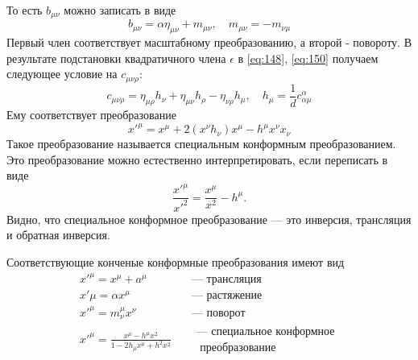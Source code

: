 \documentclass[a4paper,12pt]{article}
\theoremstyle{definition}
\theoremstyle{definition}
\theoremstyle{definition}
\begin{document}
То есть $b_{\mu\nu}$ можно записать в виде
\begin{equation}
  \label{eq:159}
  b_{\mu\nu}=\alpha \eta_{\mu\nu} +m_{\mu\nu},\quad m_{\mu\nu}=-m_{\nu\mu}
\end{equation}
Первый член соответствует масштабному преобразованию, а второй - повороту. 
В результате подстановки квадратичного члена $\epsilon$ в \eqref{eq:148}, \eqref{eq:150} получаем следующее условие на $c_{\mu\nu\rho}$:
\begin{equation}
  \label{eq:160}
  c_{\mu\nu\rho}=\eta_{\mu\rho} h_{\nu} +\eta_{\mu\nu}h_{\rho}-\eta_{\nu\rho}h_{\mu}, \quad h_{\mu}=\frac{1}{d} c^{\alpha}_{\alpha\mu}
\end{equation}
Ему соответствует преобразование
\begin{equation}
  \label{eq:161}
  x'^{\mu}=x^{\mu}+2 (x^{\nu}h_{\nu})x^{\mu} -h^{\mu} x^{\nu}x_{\nu}
\end{equation}
Такое преобразование называется специальным конформным преобразованием.
Это преобразование можно естественно интерпретировать, если переписать в виде
\begin{equation}
  \label{eq:162}
  \frac{x'^{\mu}}{x'^2}=\frac{x^{\mu}}{x^2}-h^{\mu}.
\end{equation}
Видно, что специальное конформное преобразование --- это инверсия, трансляция и обратная инверсия. 

Соответствующие конченые конформные преобразования имеют вид
\begin{eqnarray}
  \label{eq:163}
  x'^{\mu}=x^{\mu}+a^{\mu}&\quad \mbox{--- трансляция}\\
  x'{\mu}=\alpha x^{\mu} &\quad \mbox{--- растяжение}\\
  x'^{\mu}=m^{\mu}_{\nu} x^{\nu} &\quad \mbox{--- поворот}\\
  x'^{\mu}=\frac{x^{\mu}-h^{\mu}x^2}{1-2h_{\mu}x^{\mu}+h^2 x^2}  & \quad \begin{array}{c}\mbox{--- специальное конформное}\\ \mbox{ преобразование}\end{array}
\end{eqnarray}
\end{document}
